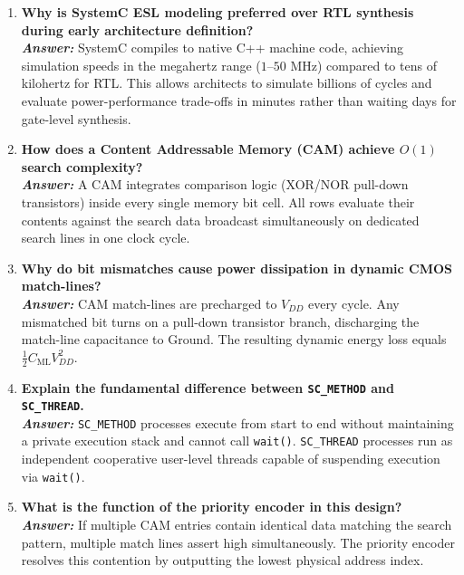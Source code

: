 \documentclass[11pt,a4paper,oneside]{report}
\begin{document}
\begin{enumerate}[leftmargin=*, label=\bfseries Q\arabic*:]
    \item \textbf{Why is SystemC ESL modeling preferred over RTL synthesis during early architecture definition?}\\
    \textit{\textbf{Answer:}} SystemC compiles to native C++ machine code, achieving simulation speeds in the megahertz range ($1\text{--}50\text{ MHz}$) compared to tens of kilohertz for RTL. This allows architects to simulate billions of cycles and evaluate power-performance trade-offs in minutes rather than waiting days for gate-level synthesis.

    \item \textbf{How does a Content Addressable Memory (CAM) achieve $O(1)$ search complexity?}\\
    \textit{\textbf{Answer:}} A CAM integrates comparison logic (XOR/NOR pull-down transistors) inside every single memory bit cell. All rows evaluate their contents against the search data broadcast simultaneously on dedicated search lines in one clock cycle.

    \item \textbf{Why do bit mismatches cause power dissipation in dynamic CMOS match-lines?}\\
    \textit{\textbf{Answer:}} CAM match-lines are precharged to $V_{DD}$ every cycle. Any mismatched bit turns on a pull-down transistor branch, discharging the match-line capacitance to Ground. The resulting dynamic energy loss equals $\frac{1}{2} C_{\text{ML}} V_{DD}^2$.

    \item \textbf{Explain the fundamental difference between \texttt{SC\_METHOD} and \texttt{SC\_THREAD}.}\\
    \textit{\textbf{Answer:}} \texttt{SC\_METHOD} processes execute from start to end without maintaining a private execution stack and cannot call \texttt{wait()}. \texttt{SC\_THREAD} processes run as independent cooperative user-level threads capable of suspending execution via \texttt{wait()}.

    \item \textbf{What is the function of the priority encoder in this design?}\\
    \textit{\textbf{Answer:}} If multiple CAM entries contain identical data matching the search pattern, multiple match lines assert high simultaneously. The priority encoder resolves this contention by outputting the lowest physical address index.


\end{enumerate}
\end{document}
